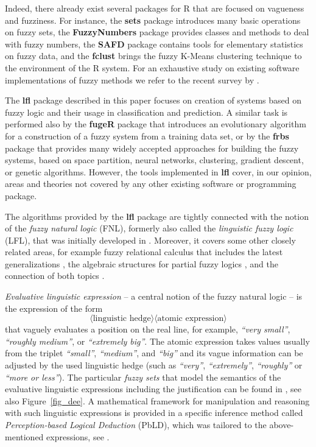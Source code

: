 \documentclass[review]{elsarticle}
\newcommand{\pkg}[1]{\textbf{#1}}
\newcommand{\proglang}[1]{#1}
\newcommand{\R}{\proglang{R}}
\begin{document}
Indeed, there already exist several packages for \R{} that are focused on vagueness and fuzziness. For instance, the \pkg{sets} package \citep{setsPkg} introduces many basic operations on fuzzy sets, the \pkg{FuzzyNumbers} package \citep{FuzzyNumbersPkg} provides classes and methods to deal with fuzzy numbers, the \pkg{SAFD} package \citep{safdPkg} contains tools for elementary statistics on fuzzy data, and the \pkg{fclust} \citep{fclustPkg,Ferraro_R-toolbox_FSS2015} brings the fuzzy K-Means clustering technique to the environment of the \R{} system. For an exhaustive study on existing software implementations of fuzzy methods we refer to the recent survey by \cite{AlcalAlonso:fuzzySW_IEEETFS16}.

The \pkg{lfl} package described in this paper focuses on creation of systems based on fuzzy logic and their
usage in classification and prediction. A similar task is performed also by the \pkg{fugeR}
package \citep{fugeRPkg} that introduces an evolutionary algorithm for a construction of a fuzzy system from
a training data set, or by the \pkg{frbs} package \citep{frbsPkg} that provides many widely
accepted approaches for building the fuzzy systems, based on space partition, neural networks,
clustering, gradient descent, or genetic algorithms. However, the tools implemented in \pkg{lfl} cover, in our opinion, areas and theories not covered by any other existing software or programming package.

The algorithms provided by the \pkg{lfl} package are tightly connected with the notion of
the \emph{fuzzy natural logic} (FNL), formerly also called the \emph{linguistic fuzzy logic} (LFL),
that was initially developed in \cite{Novak08}. Moreover, it covers some other closely related areas, for example fuzzy relational calculus  \cite{BandlerKohout78,Belohlavek_book2002,Behounek:Compositions}  that includes the latest generalizations \cite{Cao2017, Cao2017b}, the algebraic structures for partial fuzzy logics \cite{BehounekNovak:IEEE15, BehounekDankova:IPMU16}, and the connection of both topics \cite{Step_etal_Dragon_IJAR2019}.

\emph{Evaluative linguistic expression} -- a central notion of the fuzzy natural logic -- is the expression of the form
%
$$\langle \textrm{linguistic hedge}\rangle \langle \textrm{atomic expression}\rangle$$
%
that vaguely evaluates a position on the real line, for example, \emph{``very small''}, \emph{``roughly medium''}, or \emph{``extremely big''}. The atomic expression takes values usually from the triplet 
\emph{``small''}, \emph{``medium''}, and \emph{``big''} and its vague information can be adjusted by the used linguistic hedge (such as \emph{``very''}, \emph{``extremely''}, \emph{``roughly''} or \emph{``more or less''}).
The particular \emph{fuzzy sets} that model the semantics of the evaluative linguistic expressions including the justification can be found in \cite{Novak08}, see also Figure~\ref{fig_dee}. A mathematical framework for manipulation and reasoning with
such linguistic expressions is provided in a specific inference method called  \emph{Perception-based
Logical Deduction} (PbLD), which was tailored to the above-mentioned expressions, see \cite{Dvovrak2004formal,Novak:PbLD, Dvorak_etal:RedundancyFSS}.
\end{document}
